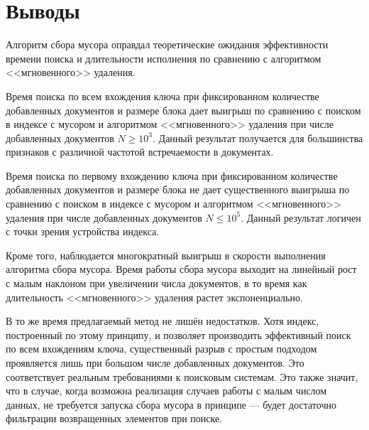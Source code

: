 \newpage
\section{Выводы}

Алгоритм сбора мусора оправдал теоретические ожидания эффективности времени
поиска и длительности исполнения по сравнению с алгоритмом <<мгновенного>>
удаления. 

Время поиска по всем вхождения ключа при фиксированном количестве
добавленных документов и размере блока дает выигрыш по сравнению
с поиском в индексе с мусором и алгоритмом <<мгновенного>> удаления при числе
добавленных документов $N \ge 10^3$. Данный результат получается для большинства
признаков с различной частотой встречаемости в документах.

Время поиска по первому вхождению ключа при фиксированном количестве
добавленных документов и размере блока не дает существенного выигрыша по
сравнению с поиском в индексе с мусором и алгоритмом <<мгновенного>> удаления
при числе добавленных документов $N \leq 10^5$. Данный результат логичен с точки
зрения устройства индекса.

Кроме того, наблюдается многократный выигрыш в скорости выполнения алгоритма сбора
мусора. Время работы сбора мусора выходит на линейный рост с малым наклоном при увеличении
числа документов, в то время как длительность <<мгновенного>> удаления растет
экспоненциально.

В то же время предлагаемый метод не лишён недостатков. Хотя индекс,
построенный по этому принципу, и позволяет производить эффективный поиск по
всем вхождениям ключа, существенный разрыв с простым подходом проявляется лишь
при большом числе добавленных документов. Это соответствует реальным требованиями
к поисковым системам. Это также значит, что в случае, когда возможна реализация
случаев работы с малым числом данных, не требуется запуска сбора мусора в принципе
— будет достаточно фильтрации возвращенных элементов при поиске.
